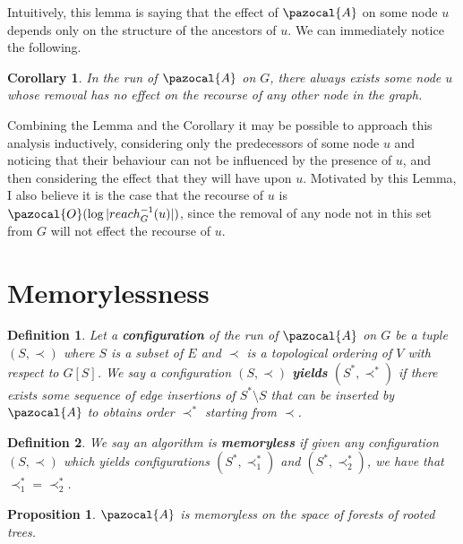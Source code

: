 \documentclass{article}
\newtheorem{corollary}{Corollary}
\newtheorem{proposition}{Proposition}
\newtheorem{definition}{Definition}
\begin{document}
Intuitively, this lemma is saying that the effect of $\pazocal{A}$ on some node $u$ depends only on the structure of the ancestors of $u$. We can immediately notice the following.

\begin{corollary}
In the run of $\pazocal{A}$ on $G$, there always exists some node $u$ whose removal has no effect on the recourse of any other node in the graph.
\end{corollary}

Combining the Lemma and the Corollary it may be possible to approach this analysis inductively, considering only the predecessors of some node $u$ and noticing that their behaviour can not be influenced by the presence of $u$, and then considering the effect that they will have upon $u$. Motivated by this Lemma, I also believe it is the case that the recourse of $u$ is $\pazocal{O}(\log{\vert reach_{G}^{-1}(u) \vert})$, since the removal of any node not in this set from $G$ will not effect the recourse of $u$.

\section{Memorylessness}

\begin{definition}
Let a \textbf{configuration} of the run of $\pazocal{A}$ on $G$ be a tuple $(S,\prec)$ where $S$ is a subset of $E$ and $\prec$ is a topological ordering of $V$ with respect to $G[S]$. We say a configuration $(S,\prec)$ \textbf{yields} $(S^*,\prec^*)$ if there exists some sequence of edge insertions of $S^* \setminus S$ that can be inserted by $\pazocal{A}$ to obtains order $\prec^*$ starting from $\prec$.
\end{definition}

\begin{definition}
We say an algorithm is \textbf{memoryless} if given any configuration $(S, \prec)$ which yields configurations $(S^*, \prec^*_1)$ and $(S^*, \prec^*_2)$, we have that $\prec^*_1 = \prec^*_2$.
\end{definition}

\begin{proposition}
$\pazocal{A}$ is memoryless on the space of forests of rooted trees.
\end{proposition}
\end{document}
